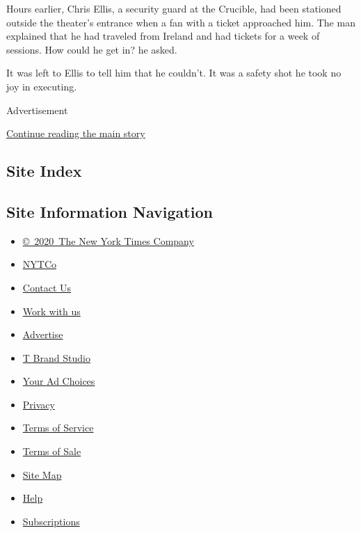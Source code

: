 Hours earlier, Chris Ellis, a security guard at the Crucible, had been
stationed outside the theater's entrance when a fan with a ticket
approached him. The man explained that he had traveled from Ireland and
had tickets for a week of sessions. How could he get in? he asked.

It was left to Ellis to tell him that he couldn't. It was a safety shot
he took no joy in executing.

Advertisement

\protect\hyperlink{after-bottom}{Continue reading the main story}

\hypertarget{site-index}{%
\subsection{Site Index}\label{site-index}}

\hypertarget{site-information-navigation}{%
\subsection{Site Information
Navigation}\label{site-information-navigation}}

\begin{itemize}
\tightlist
\item
  \href{https://help.nytimes3xbfgragh.onion/hc/en-us/articles/115014792127-Copyright-notice}{©~2020~The
  New York Times Company}
\end{itemize}

\begin{itemize}
\tightlist
\item
  \href{https://www.nytco.com/}{NYTCo}
\item
  \href{https://help.nytimes3xbfgragh.onion/hc/en-us/articles/115015385887-Contact-Us}{Contact
  Us}
\item
  \href{https://www.nytco.com/careers/}{Work with us}
\item
  \href{https://nytmediakit.com/}{Advertise}
\item
  \href{http://www.tbrandstudio.com/}{T Brand Studio}
\item
  \href{https://www.nytimes3xbfgragh.onion/privacy/cookie-policy\#how-do-i-manage-trackers}{Your
  Ad Choices}
\item
  \href{https://www.nytimes3xbfgragh.onion/privacy}{Privacy}
\item
  \href{https://help.nytimes3xbfgragh.onion/hc/en-us/articles/115014893428-Terms-of-service}{Terms
  of Service}
\item
  \href{https://help.nytimes3xbfgragh.onion/hc/en-us/articles/115014893968-Terms-of-sale}{Terms
  of Sale}
\item
  \href{https://spiderbites.nytimes3xbfgragh.onion}{Site Map}
\item
  \href{https://help.nytimes3xbfgragh.onion/hc/en-us}{Help}
\item
  \href{https://www.nytimes3xbfgragh.onion/subscription?campaignId=37WXW}{Subscriptions}
\end{itemize}
